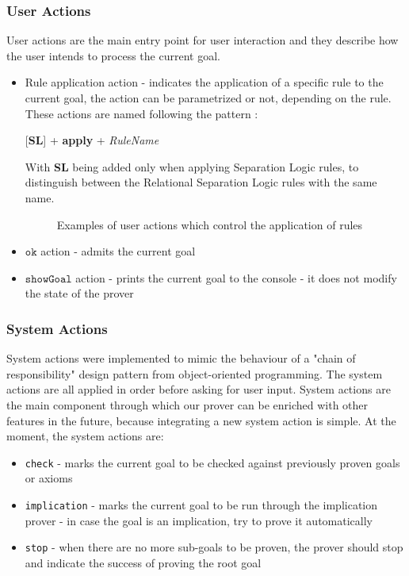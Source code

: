 \documentclass[12pt,a4paper]{article}
\begin{document}
\subsubsection{User Actions}
User actions are the main entry point for user interaction and they describe how the user intends to process the current goal.
\begin{itemize}
	\item {Rule application action - indicates the application of a specific rule to the current goal, the action can be parametrized or not, depending on the rule. These actions are named following the pattern :	
	\begin{center}
		[\textbf{SL}] + \textbf{apply} + \textit{RuleName}
	\end{center}
		With \textbf{SL} being added only when applying Separation Logic rules, to distinguish between the Relational Separation Logic rules with the same name.
	}
	\begin{figure}[h]
		\caption{Examples of user actions which control the application of rules}
		\label{fig:userActions}
	\end{figure}
	\item {\(\mathtt{ok}\) action - admits the current goal}
	\item {\(\mathtt{showGoal}\) action - prints the current goal to the console - it does not modify the state of the prover}
\end{itemize}
\subsubsection{System Actions}
System actions were implemented to mimic the behaviour of a "chain of responsibility" design pattern from object-oriented programming. The system actions are all applied in order before asking for user input. System actions are the main component through which our prover can be enriched with other features in the future, because integrating a new system action is simple. At the moment, the system actions are:
\begin{itemize}
	\item {\texttt{check}} - marks the current goal to be checked against previously proven goals or axioms
	\item {\texttt{implication}} - marks the current goal to be run through the implication prover - in case the goal is an implication, try to prove it automatically
	\item {\texttt{stop}} - when there are no more sub-goals to be proven, the prover should stop and indicate the success of proving the root goal
\end{itemize}
\end{document}
